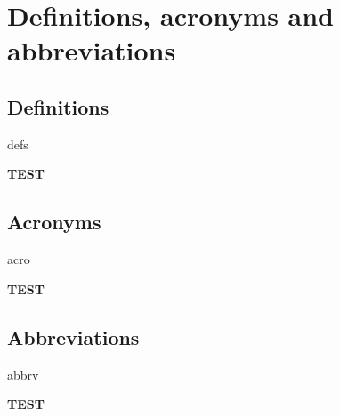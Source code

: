 \section{Definitions, acronyms and abbreviations}

\subsection{Definitions}
	\begin{labeling}{defs}
		\item[\textbf{TEST}] \blindtext
	\end{labeling}

\subsection{Acronyms}
	\begin{labeling}{acro}
		\item[\textbf{TEST}] \blindtext
	\end{labeling}

\subsection{Abbreviations}
	\begin{labeling}{abbrv}
		\item[\textbf{TEST}] \blindtext
	\end{labeling}